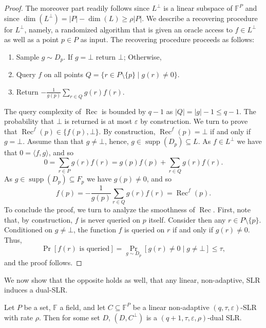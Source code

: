 \begin{proof}
The moreover part readily follows since $L^\perp$ is a linear subspace of $\mathbb F^P$ and since $\dim(L^\perp)=|P|-\dim(L)\geq\rho|P|$. We describe a recovering procedure for $L^\perp$, namely, a randomized algorithm that is given an oracle access to $f\in L^\perp$ as well as a point $p\in P$ as input. The recovering procedure proceeds as follows:
\begin{enumerate}
\item Sample $g\sim D_p$. If $g=\bot$ return $\bot$; Otherwise,
\item Query $f$ on all points $Q=\{r\in P\setminus\{p\}\mid g(r)\ne0\}$.
\item Return $-\frac1{g(p)}\sum_{r\in Q}g(r)f(r)$.
\end{enumerate}
The query complexity of $\operatorname{Rec}$ is bounded by $q-1$ as $|Q|=|g|-1\leq q-1$. The probability that $\bot$ is returned is at most $\varepsilon$ by construction. We turn to prove that $\operatorname{Rec}^f(p)\in\{f(p),\bot\}$. By construction, $\operatorname{Rec}^f(p)=\bot$ if and only if $g=\bot$. Assume than that $g\ne\bot$, hence, $g\in\operatorname{supp}(D_p)\subseteq L$. As $f\in L^\perp$ we have that $0=\langle f,g\rangle$, and so
\[0=\sum_{r\in P}g(r)f(r)=g(p)f(p)+\sum_{r\in Q}g(r)f(r).\]
As $g\in\operatorname{supp}(D_p)\subseteq F_p$ we have $g(p)\ne0$, and so
\[f(p)=-\frac1{g(p)}\sum_{r\in Q}g(r)f(r)=\operatorname{Rec}^f(p).\]
To conclude the proof, we turn to analyze the smoothness of $\operatorname{Rec}$. First, note that, by construction, $f$ is never queried on $p$ itself. Consider then any $r\in P\setminus\{p\}$. Conditioned on $g\ne\bot$, the function $f$ is queried on $r$ if and only if $g(r)\ne0$. Thus,
\[\Pr[f(r)\text{ is queried}]=\Pr_{g\sim D_p}[g(r)\ne0\mid g\ne\bot]\leq\tau,\]
and the proof follows.
\end{proof}
We now show that the opposite holds as well, that any linear, non-adaptive, SLR induces a dual-SLR.
\begin{ntlemma}
Let $P$ be a set, $\mathbb F$ a field, and let $C\subseteq\mathbb F^P$ be a linear non-adaptive $(q,\tau,\varepsilon)$-SLR with rate $\rho$. Then for some set $D$, $(D,C^\perp)$ is a $(q+1,\tau,\varepsilon,\rho)$-dual SLR.
\end{ntlemma}
